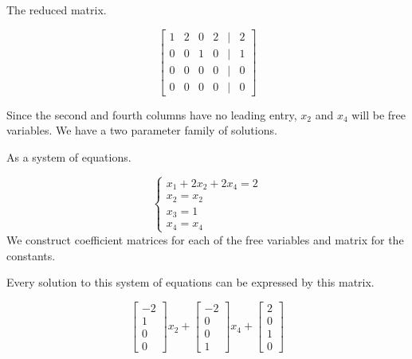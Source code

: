 \begin{example}
\begin{solution}
        The reduced matrix.

        \[\begin{bmatrix}
            1 & 2 & 0 & 2 & \vert & 2 \\
            0 & 0 & 1 & 0 & \vert & 1 \\
            0 & 0 & 0 & 0 & \vert & 0 \\
            0 & 0 & 0 & 0 & \vert & 0
        \end{bmatrix}\]

        Since the second and fourth columns have no leading entry, \(x_2\) and \(x_4\) will be free variables. We have a two parameter family of solutions.

        As a system of equations.

        \[\begin{cases}
            x_1 + 2x_2 +2x_4 =2 \\
            x_2 =x_2 \\
            x_3 = 1 \\
            x_4 = x_4
        \end{cases}\]
        We construct coefficient matrices for each of the free variables and matrix for the constants.

        Every solution to this system of equations can be expressed by this matrix.

        \[\begin{bmatrix}
            -2 \\ 1 \\ 0 \\ 0
        \end{bmatrix}x_2 + \begin{bmatrix}
            -2 \\ 0 \\ 0 \\ 1
        \end{bmatrix}x_4 +\begin{bmatrix}
            2 \\ 0 \\ 1 \\ 0
        \end{bmatrix}\]
    \end{solution}
\end{example}